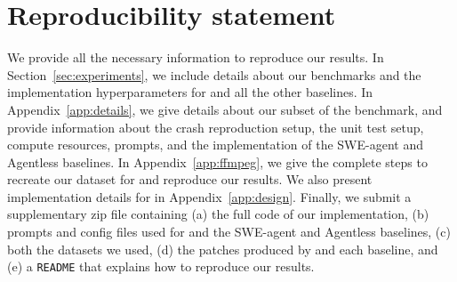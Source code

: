 \section*{Reproducibility statement}

We provide all the necessary information to reproduce our results.
In Section~\ref{sec:experiments}, we include details about our benchmarks and the implementation hyperparameters for \cresearcher{} and all the other baselines.
In Appendix~\ref{app:details}, we give details about our subset of the \kbenchsyz{} benchmark, and provide information about the crash reproduction setup, the unit test setup, compute resources, prompts, and the implementation of the SWE-agent and Agentless baselines.
In Appendix~\ref{app:ffmpeg}, we give the complete steps to recreate our dataset for \ffmpeg{} and reproduce our results.
We also present implementation details for \cresearcher{} in Appendix~\ref{app:design}.
Finally, we submit a supplementary zip file containing (a) the full code of our implementation, (b) prompts and config files used for \cresearcher{} and the SWE-agent and Agentless baselines, (c) both the datasets we used, (d) the patches produced by \cresearcher{} and each baseline, and (e) a \texttt{README} that explains how to reproduce our results.